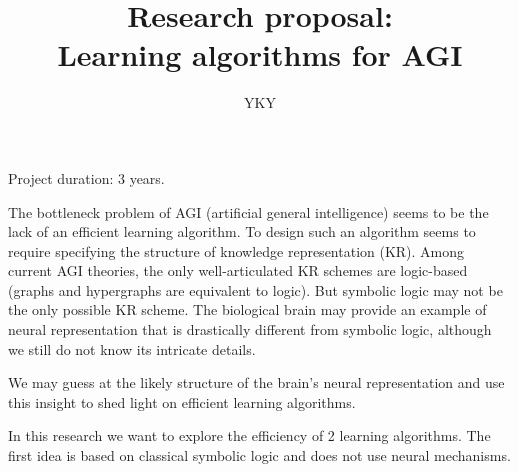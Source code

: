 

\usepackage{xeCJK}
\usepackage{color}
\usepackage{hyperref}
\usepackage{mathtools}

\title{{\small Research proposal:} \\ Learning algorithms for AGI}
\author{YKY}


\maketitle

Project duration: 3 years.

The bottleneck problem of AGI (artificial general intelligence) \parencite{Goertzel2007} seems to be the lack of an efficient learning algorithm.  To design such an algorithm seems to require specifying the structure of knowledge representation (KR).  Among current AGI theories, the only well-articulated KR schemes are logic-based (graphs and hypergraphs are equivalent to logic).  But symbolic logic may not be the only possible KR scheme.  The biological brain may provide an example of neural representation that is drastically different from symbolic logic, although we still do not know its intricate details.

We may guess at the likely structure of the brain's neural representation and use this insight to shed light on efficient learning algorithms.

In this research we want to explore the efficiency of 2 learning algorithms.  The first idea is based on classical symbolic logic and does not use neural mechanisms.

